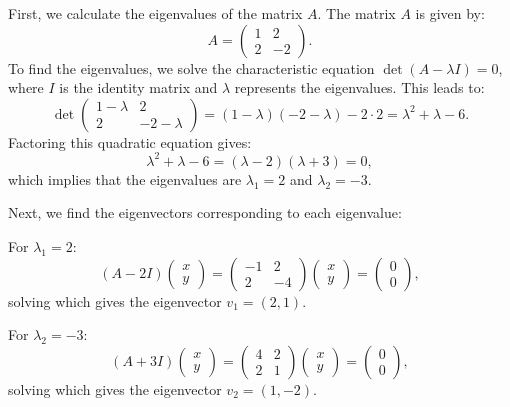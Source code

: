 \documentclass{report}
\begin{document}
\sol

First, we calculate the eigenvalues of the matrix \(A\). The matrix \(A\) is given by:
\[
A = \begin{pmatrix} 1 & 2 \\ 2 & -2 \end{pmatrix}.
\]
To find the eigenvalues, we solve the characteristic equation \(\det(A - \lambda I) = 0\), where \(I\) is the identity matrix and \(\lambda\) represents the eigenvalues. This leads to:
\[
\det \begin{pmatrix} 1 - \lambda & 2 \\ 2 & -2 - \lambda \end{pmatrix} = (1 - \lambda)(-2 - \lambda) - 2 \cdot 2 = \lambda^2 + \lambda - 6.
\]
Factoring this quadratic equation gives:
\[
\lambda^2 + \lambda - 6 = (\lambda - 2)(\lambda + 3) = 0,
\]
which implies that the eigenvalues are \(\lambda_1 = 2\) and \(\lambda_2 = -3\).

Next, we find the eigenvectors corresponding to each eigenvalue:

For \(\lambda_1 = 2\):
\[
(A - 2I) \begin{pmatrix} x \\ y \end{pmatrix} = \begin{pmatrix} -1 & 2 \\ 2 & -4 \end{pmatrix} \begin{pmatrix} x \\ y \end{pmatrix} = \begin{pmatrix} 0 \\ 0 \end{pmatrix},
\]
solving which gives the eigenvector \(v_1 = (2, 1)\).

For \(\lambda_2 = -3\):
\[
(A + 3I) \begin{pmatrix} x \\ y \end{pmatrix} = \begin{pmatrix} 4 & 2 \\ 2 & 1 \end{pmatrix} \begin{pmatrix} x \\ y \end{pmatrix} = \begin{pmatrix} 0 \\ 0 \end{pmatrix},
\]
solving which gives the eigenvector \(v_2 = (1, -2)\).
\end{document}
